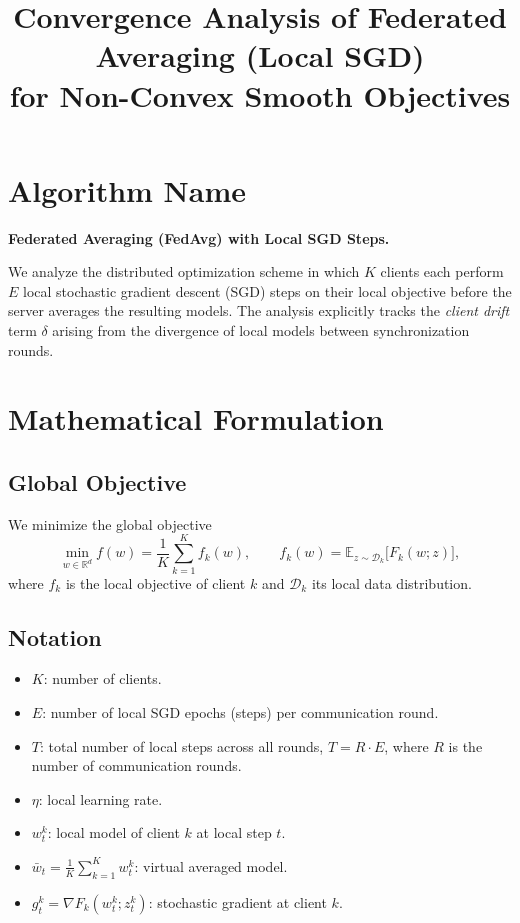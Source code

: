 \documentclass[11pt]{article}
\title{Convergence Analysis of Federated Averaging (Local SGD) \\ for Non-Convex Smooth Objectives}
\author{}
\date{}
\begin{document}
\maketitle

\section*{Algorithm Name}
\textbf{Federated Averaging (FedAvg) with Local SGD Steps.}

We analyze the distributed optimization scheme in which $K$ clients each
perform $E$ local stochastic gradient descent (SGD) steps on their local
objective before the server averages the resulting models. The analysis
explicitly tracks the \emph{client drift} term $\delta$ arising from the
divergence of local models between synchronization rounds.

\section*{Mathematical Formulation}

\subsection*{Global Objective}
We minimize the global objective
\[
\min_{w \in \mathbb{R}^d} f(w) = \frac{1}{K}\sum_{k=1}^{K} f_k(w),
\qquad
f_k(w) = \mathbb{E}_{z \sim \mathcal{D}_k}\big[ F_k(w; z)\big],
\]
where $f_k$ is the local objective of client $k$ and $\mathcal{D}_k$ its
local data distribution.

\subsection*{Notation}
\begin{itemize}
\item $K$: number of clients.
\item $E$: number of local SGD epochs (steps) per communication round.
\item $T$: total number of local steps across all rounds, $T = R\cdot E$,
      where $R$ is the number of communication rounds.
\item $\eta$: local learning rate.
\item $w_{t}^{k}$: local model of client $k$ at local step $t$.
\item $\bar{w}_t = \frac{1}{K}\sum_{k=1}^K w_t^k$: virtual averaged model.
\item $g_t^k = \nabla F_k(w_t^k; z_t^k)$: stochastic gradient at client $k$.
\end{itemize}
\end{document}
